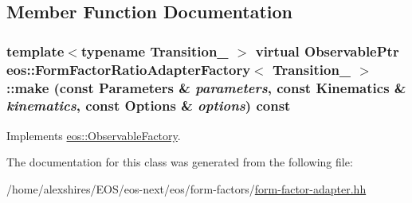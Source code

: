 \subsection{Member Function Documentation}
\hypertarget{classeos_1_1FormFactorRatioAdapterFactory_a2382bfbe9ce737d606a9d5abc271f92d}{
\subsubsection[{make}]{\setlength{\rightskip}{0pt plus 5cm}template$<$typename Transition\_\- $>$ virtual {\bf ObservablePtr} {\bf eos::FormFactorRatioAdapterFactory}$<$ Transition\_\- $>$::make (const {\bf Parameters} \& {\em parameters}, \/  const {\bf Kinematics} \& {\em kinematics}, \/  const {\bf Options} \& {\em options}) const}}
\label{classeos_1_1FormFactorRatioAdapterFactory_a2382bfbe9ce737d606a9d5abc271f92d}


Implements \hyperlink{classeos_1_1ObservableFactory_ac338d98049d8db85548aab9d3c74bcda}{eos::ObservableFactory}.

The documentation for this class was generated from the following file:\begin{DoxyCompactItemize}
\item 
/home/alexshires/EOS/eos-\/next/eos/form-\/factors/\hyperlink{form-factor-adapter_8hh}{form-\/factor-\/adapter.hh}\end{DoxyCompactItemize}
